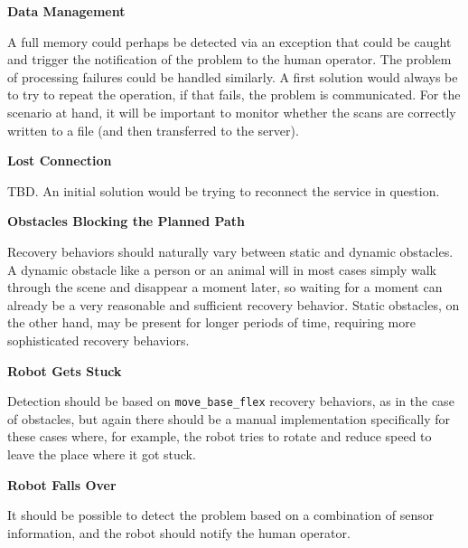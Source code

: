 \documentclass[english, master, utf8]{base/thesis_KBS}
\newcommand{\code}[1]{\colorbox{light-gray}{\texttt{#1}}}
\begin{document}
\noindent
\textbf{Data Management}\newline

\noindent
A full memory could perhaps be detected via an exception that could be caught and trigger the notification of the problem to the human operator.
The problem of processing failures could be handled similarly. A first solution would always be to try to repeat the operation, if that fails, the problem is communicated.\newline
For the scenario at hand, it will be important to monitor whether the scans are correctly written to a file (and then transferred to the server).\newline

\noindent
\textbf{Lost Connection}\newline

\noindent
TBD.\newline
An initial solution would be trying to reconnect the service in question.\newline

\noindent
\textbf{Obstacles Blocking the Planned Path}\newline

\noindent
Recovery behaviors should naturally vary between static and dynamic obstacles. A dynamic obstacle like a person or an animal will in most cases 
simply walk through the scene and disappear a moment later, so waiting for a moment can already be a very reasonable and sufficient recovery behavior. 
Static obstacles, on the other hand, may be present for longer  periods of time, requiring more sophisticated recovery behaviors.\newline

\noindent
\textbf{Robot Gets Stuck}\newline

\noindent
Detection should be based on \code{move\_base\_flex} recovery behaviors, as in the case of obstacles, but again there should be a manual implementation 
specifically for these cases where, for example, the robot tries to rotate and reduce speed to leave the place where it got stuck.\newline

\noindent
\textbf{Robot Falls Over}\newline

\noindent
It should be possible to detect the problem based on a combination of sensor information, and the robot should notify the human operator.\newline
\end{document}
